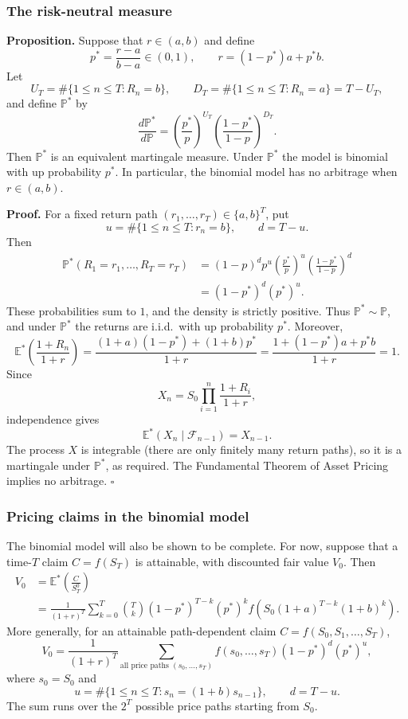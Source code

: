\documentclass[11pt,a4paper]{article}
\begin{document}
\subsubsection*{The risk-neutral measure}

\noindent\textbf{Proposition.}
Suppose that $r\in(a,b)$ and define
\[
p^*=\frac{r-a}{b-a}\in(0,1),\qquad
r=(1-p^*)a+p^*b.
\]
Let
\[
U_T=\#\{1\leq n\leq T:R_n=b\},\qquad
D_T=\#\{1\leq n\leq T:R_n=a\}=T-U_T,
\]
and define $\mathbb P^*$ by
\[
\frac{d\mathbb P^*}{d\mathbb P}
=\left(\frac{p^*}{p}\right)^{U_T}
 \left(\frac{1-p^*}{1-p}\right)^{D_T}.
\]
Then $\mathbb P^*$ is an equivalent martingale measure. Under
$\mathbb P^*$ the model is binomial with up probability $p^*$.
In particular, the binomial model has no arbitrage when $r\in(a,b)$.

\noindent\textbf{Proof.}
For a fixed return path $(r_1,\ldots,r_T)\in\{a,b\}^T$, put
\[
u=\#\{1\leq n\leq T:r_n=b\},\qquad d=T-u.
\]
Then
\[
\begin{aligned}
\mathbb P^*(R_1=r_1,\ldots,R_T=r_T)
&=(1-p)^d p^u
  \left(\frac{p^*}{p}\right)^u
  \left(\frac{1-p^*}{1-p}\right)^d\\
&=(1-p^*)^d(p^*)^u.
\end{aligned}
\]
These probabilities sum to $1$, and the density is strictly positive.
Thus $\mathbb P^*\sim\mathbb P$, and under $\mathbb P^*$ the returns
are i.i.d.\ with up probability $p^*$. Moreover,
\[
\mathbb E^*\!\left(\frac{1+R_n}{1+r}\right)
=\frac{(1+a)(1-p^*)+(1+b)p^*}{1+r}
=\frac{1+(1-p^*)a+p^*b}{1+r}=1.
\]
Since
\[
X_n=S_0\prod_{i=1}^n\frac{1+R_i}{1+r},
\]
independence gives
\[
\mathbb E^*(X_n\mid\mathcal F_{n-1})=X_{n-1}.
\]
The process $X$ is integrable (there are only finitely many return
paths), so it is a martingale under $\mathbb P^*$, as required.
The Fundamental Theorem of Asset Pricing implies no arbitrage.
\hfill$\square$

\subsubsection*{Pricing claims in the binomial model}

The binomial model will also be shown to be complete. For now, suppose
that a time-$T$ claim $C=f(S_T)$ is attainable, with discounted fair
value $V_0$. Then
\[
\begin{aligned}
V_0
&=\mathbb E^*\!\left(\frac{C}{S_T^0}\right)\\
&=\frac{1}{(1+r)^T}\sum_{k=0}^T
  \binom{T}{k}(1-p^*)^{T-k}(p^*)^k
  f\!\left(S_0(1+a)^{T-k}(1+b)^k\right).
\end{aligned}
\]
More generally, for an attainable path-dependent claim
$C=f(S_0,S_1,\ldots,S_T)$,
\[
V_0=\frac{1}{(1+r)^T}
\sum_{\text{all price paths }(s_0,\ldots,s_T)}
f(s_0,\ldots,s_T)(1-p^*)^d(p^*)^u,
\]
where $s_0=S_0$ and
\[
u=\#\{1\leq n\leq T:s_n=(1+b)s_{n-1}\},\qquad d=T-u.
\]
The sum runs over the $2^T$ possible price paths starting from $S_0$.
\end{document}
